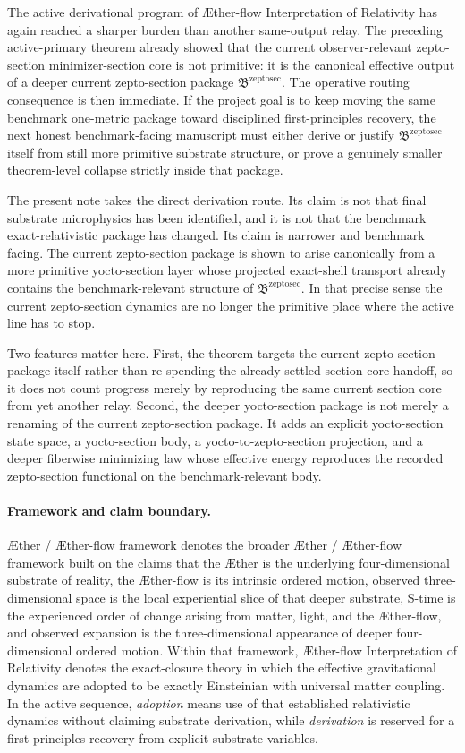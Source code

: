 \documentclass[11pt]{article}
\newcommand{\Aether}{\AE{}ther}
\newcommand{\Aflow}{\AE{}ther-flow}
\newcommand{\TheoryName}{\Aflow{} Interpretation of Relativity}
\newcommand{\TheoryProgram}{\Aether{} / \Aflow{} framework}
\newcommand{\ZeptoSectionPackage}{\mathfrak B^{\mathrm{zeptosec}}}
\begin{document}
The active derivational program of \TheoryName{} has again reached a sharper burden than another same-output relay. The preceding active-primary theorem already showed that the current observer-relevant zepto-section minimizer-section core is not primitive: it is the canonical effective output of a deeper current zepto-section package \(\ZeptoSectionPackage\). The operative routing consequence is then immediate. If the project goal is to keep moving the same benchmark one-metric package toward disciplined first-principles recovery, the next honest benchmark-facing manuscript must either derive or justify \(\ZeptoSectionPackage\) itself from still more primitive substrate structure, or prove a genuinely smaller theorem-level collapse strictly inside that package.

The present note takes the direct derivation route. Its claim is not that final substrate microphysics has been identified, and it is not that the benchmark exact-relativistic package has changed. Its claim is narrower and benchmark facing. The current zepto-section package is shown to arise canonically from a more primitive yocto-section layer whose projected exact-shell transport already contains the benchmark-relevant structure of \(\ZeptoSectionPackage\). In that precise sense the current zepto-section dynamics are no longer the primitive place where the active line has to stop.

Two features matter here. First, the theorem targets the current zepto-section package itself rather than re-spending the already settled section-core handoff, so it does not count progress merely by reproducing the same current section core from yet another relay. Second, the deeper yocto-section package is not merely a renaming of the current zepto-section package. It adds an explicit yocto-section state space, a yocto-section body, a yocto-to-zepto-section projection, and a deeper fiberwise minimizing law whose effective energy reproduces the recorded zepto-section functional on the benchmark-relevant body.

\paragraph{Framework and claim boundary.}
\TheoryProgram{} denotes the broader \Aether{} / \Aflow{} framework built on the claims that the \Aether{} is the underlying four-dimensional substrate of reality, the \Aflow{} is its intrinsic ordered motion, observed three-dimensional space is the local experiential slice of that deeper substrate, S-time is the experienced order of change arising from matter, light, and the \Aflow{}, and observed expansion is the three-dimensional appearance of deeper four-dimensional ordered motion. Within that framework, \TheoryName{} denotes the exact-closure theory in which the effective gravitational dynamics are adopted to be exactly Einsteinian with universal matter coupling. In the active sequence, \emph{adoption} means use of that established relativistic dynamics without claiming substrate derivation, while \emph{derivation} is reserved for a first-principles recovery from explicit substrate variables.
\end{document}
